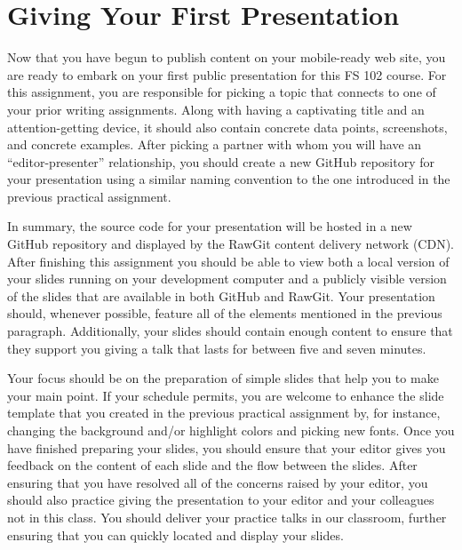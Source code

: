 

\usepackage[compact]{titlesec}




\vspace*{-.2in}
\section*{Giving Your First Presentation}

Now that you have begun to publish content on your mobile-ready web site, you are ready to embark on your first public
presentation for this FS 102 course. For this assignment, you are responsible for picking a topic that connects to one
of your prior writing assignments. Along with having a captivating title and an attention-getting device, it should also
contain concrete data points, screenshots, and concrete examples. After picking a partner with whom you will have an
``editor-presenter'' relationship, you should create a new GitHub repository for your presentation using a similar
naming convention to the one introduced in the previous practical assignment.

In summary, the source code for your presentation will be hosted in a new GitHub repository and displayed by the RawGit
content delivery network (CDN). After finishing this assignment you should be able to view both a local version of your
slides running on your development computer and a publicly visible version of the slides that are available in both
GitHub and RawGit. Your presentation should, whenever possible, feature all of the elements mentioned in the previous
paragraph. Additionally, your slides should contain enough content to ensure that they support you giving a talk that
lasts for between five and seven minutes.

Your focus should be on the preparation of simple slides that help you to make your main point. If your schedule
permits, you are welcome to enhance the slide template that you created in the previous practical assignment by, for
instance, changing the background and/or highlight colors and picking new fonts. Once you have finished preparing your
slides, you should ensure that your editor gives you feedback on the content of each slide and the flow between the
slides. After ensuring that you have resolved all of the concerns raised by your editor, you should also practice giving
the presentation to your editor and your colleagues not in this class. You should deliver your practice talks in our
classroom, further ensuring that you can quickly located and display your slides.

